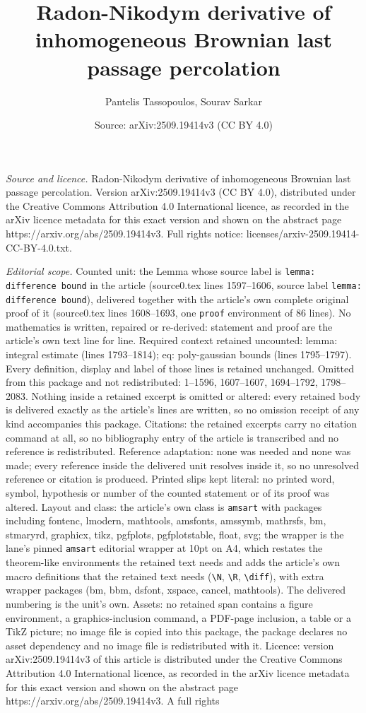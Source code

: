 \documentclass[10pt,a4paper]{amsart}
\title[Radon-Nikodym derivative of inhomogeneous Brownian last pass]{Radon-Nikodym derivative of inhomogeneous Brownian last passage percolation}
\author{Pantelis Tassopoulos, Sourav Sarkar}
\date{Source: arXiv:2509.19414v3 (CC BY 4.0)}
\begin{document}
\maketitle

\noindent\emph{Source and licence.} Radon-Nikodym derivative of inhomogeneous Brownian last passage percolation. Version arXiv:2509.19414v3 (CC BY 4.0), distributed under the Creative Commons Attribution 4.0 International licence, as recorded in the arXiv licence metadata for this exact version and shown on the abstract page https://arxiv.org/abs/2509.19414v3. Full rights notice: licenses/arxiv-2509.19414-CC-BY-4.0.txt.\par\smallskip

\noindent\textit{Editorial scope.} Counted unit: the Lemma whose source label is \texttt{lemma: difference bound} in the article (source0.tex lines 1597--1606, source label \texttt{lemma: difference bound}), delivered together with the article's own complete original proof of it (source0.tex lines 1608--1693, one \texttt{proof} environment of 86 lines). No mathematics is written, repaired or re-derived: statement and proof are the article's own text line for line. Required context retained uncounted: lemma: integral estimate (lines 1793--1814); eq: poly-gaussian bounds (lines 1795--1797). Every definition, display and label of those lines is retained unchanged. Omitted from this package and not redistributed: 1--1596, 1607--1607, 1694--1792, 1798--2083. Nothing inside a retained excerpt is omitted or altered: every retained body is delivered exactly as the article's lines are written, so no omission receipt of any kind accompanies this package. Citations: the retained excerpts carry no citation command at all, so no bibliography entry of the article is transcribed and no reference is redistributed. Reference adaptation: none was needed and none was made; every reference inside the delivered unit resolves inside it, so no unresolved reference or citation is produced. Printed slips kept literal: no printed word, symbol, hypothesis or number of the counted statement or of its proof was altered. Layout and class: the article's own class is \texttt{amsart} with packages including fontenc, lmodern, mathtools, amsfonts, amssymb, mathrsfs, bm, stmaryrd, graphicx, tikz, pgfplots, pgfplotstable, float, svg; the wrapper is the lane's pinned \texttt{amsart} editorial wrapper at 10pt on A4, which restates the theorem-like environments the retained text needs and adds the article's own macro definitions that the retained text needs (\texttt{\textbackslash N}, \texttt{\textbackslash R}, \texttt{\textbackslash diff}), with extra wrapper packages (bm, bbm, dsfont, xspace, cancel, mathtools). The delivered numbering is the unit's own. Assets: no retained span contains a figure environment, a graphics-inclusion command, a PDF-page inclusion, a table or a TikZ picture; no image file is copied into this package, the package declares no asset dependency and no image file is redistributed with it. Licence: version arXiv:2509.19414v3 of this article is distributed under the Creative Commons Attribution 4.0 International licence, as recorded in the arXiv licence metadata for this exact version and shown on the abstract page https://arxiv.org/abs/2509.19414v3. A full rights 
\end{document}
